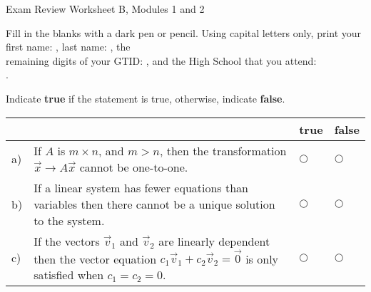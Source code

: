 \documentclass[12pt]{exam}
\newcommand{\Semester}{Fall}
\newcommand{\TestName}{Exam Review Worksheet B, Modules 1 and 2}
\begin{document}
    
\begin{center}
{\Large \TestName} %
\end{center}


\begin{questions}
\question[1] Fill in the blanks with a dark pen or pencil. 
Using capital letters only, print your first name: \framebox{\strut\hspace{5cm}}, last name: \framebox{\strut\hspace{5cm}}, the \\[2pt] remaining digits of your GTID:  \framebox{\strut\hspace{0.2cm}}\framebox{\strut\hspace{0.2cm}}\framebox{\strut\hspace{0.2cm}}\framebox{\strut\hspace{0.2cm}}\framebox{\strut\hspace{0.2cm}}\framebox{\strut\hspace{0.2cm}}\framebox{\strut\hspace{0.2cm}}, and the High School that you attend: \\[2pt]\framebox{\strut\hspace{6cm}}.

\question[5] Indicate \textbf{true} if the statement is true, otherwise, indicate \textbf{false}.

    \vspace{-0.8cm}
    \setlength{\extrarowheight}{0.25cm}
    \begin{center}
    \hspace{-.9cm}\begin{tabular}{ p{.15cm} p{14cm} p{.6cm} p{.6cm} }
        
        & & true &  false  \\[2pt] \hline 

        a) & If $A$ is $m \times n$, and $m>n$, then the transformation $\vec x \to A\vec x$ cannot be one-to-one.  & $\bigcirc$  & $\bigcirc$ \\ 

        b) & If a linear system has fewer equations than variables then there cannot be a unique solution to the system.  & $\bigcirc$  & $\bigcirc$ \\ 
        
        c) & If the vectors $\vec v_1$ and $\vec v_2$ are linearly dependent then the vector equation $c_1\vec v_1 + c_2\vec v_2 = \vec 0$ is only satisfied when $c_1=c_2=0$.  & $\bigcirc$  & $\bigcirc$ \\ 
        

\end{tabular}
\end{center}
\end{questions}
\end{document}
